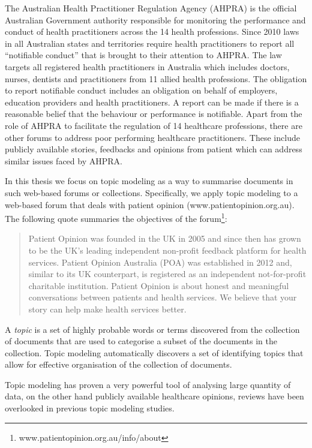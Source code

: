 \documentclass[11pt,twoside]{report}
\begin{document}
The Australian Health Practitioner Regulation Agency (AHPRA) is the official Australian Government authority responsible for
monitoring the performance and conduct of health 
practitioners across the  14 health professions. 
Since 2010 laws in all Australian 
states and territories require health practitioners to report 
all ``notifiable conduct'' that is brought to their attention to AHPRA. 
The law targets all registered health practitioners in Australia 
which includes doctors, nurses, dentists and practitioners from 
11 allied health professions. The obligation to report notifiable 
conduct includes an obligation on behalf of employers, 
education providers and health practitioners. A report can be made 
if there is a reasonable belief that the behaviour or performance is notifiable. 
Apart from the role of AHPRA to facilitate the regulation of 14 
healthcare professions, there are other forums to address 
poor performing healthcare practitioners. These include publicly 
available stories, feedbacks and opinions from patient which can address 
similar issues faced by AHPRA.  

In this thesis we
focus on topic modeling as a way to summarise documents in such web-based 
forums or collections. Specifically, we apply topic modeling to a web-based
forum that deals with patient opinion (www.patientopinion.org.au). 
The following quote summaries the objectives of the 
forum\footnote{www.patientopinion.org.au/info/about}:

\begin{quote}Patient Opinion was founded in the UK in 2005 and since then has grown 
to be the UK's leading independent non-profit feedback platform for health 
services. Patient Opinion Australia (POA) was established in 2012 and, 
similar to its UK counterpart, is registered as an independent not-for-profit 
charitable institution. Patient Opinion is about honest and meaningful 
conversations between patients and health services. We believe that your 
story can help make health services better.
\end{quote}

A \emph{topic} is a set of highly probable words or terms 
discovered from the collection
of documents that
are used to categorise a subset
of the documents in the collection. 
Topic modeling automatically discovers a set of
identifying topics that allow for effective organisation of the collection
of documents. 

Topic modeling has proven a very powerful tool of analysing large quantity of data, on the other hand publicly available healthcare opinions, reviews have been overlooked in previous topic modeling studies.
\end{document}

